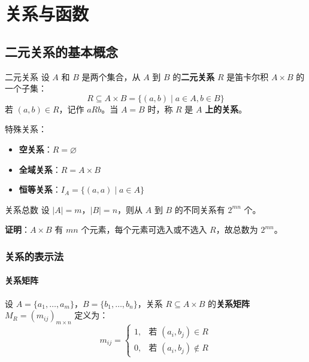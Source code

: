 \chapter{关系与函数}

\section{二元关系的基本概念}

\begin{mydefinition}{二元关系}
设 $A$ 和 $B$ 是两个集合，从 $A$ 到 $B$ 的\textbf{二元关系} $R$ 是笛卡尔积 $A \times B$ 的一个子集：
\[R \subseteq A \times B = \{(a,b) \mid a \in A, b \in B\}\]
若 $(a,b) \in R$，记作 $aRb$。当 $A = B$ 时，称 $R$ 是 $A$ \textbf{上的关系}。
\end{mydefinition}

特殊关系：
\begin{itemize}
\item \textbf{空关系}：$R = \varnothing$
\item \textbf{全域关系}：$R = A \times B$
\item \textbf{恒等关系}：$I_A = \{(a,a) \mid a \in A\}$
\end{itemize}

\begin{myTheorem}{关系总数}
设 $|A| = m$，$|B| = n$，则从 $A$ 到 $B$ 的不同关系有 $2^{mn}$ 个。

\textbf{证明}：$A \times B$ 有 $mn$ 个元素，每个元素可选入或不选入 $R$，故总数为 $2^{mn}$。
\end{myTheorem}

\subsection{关系的表示法}

\subsubsection{关系矩阵}

设 $A = \{a_1,\dots,a_m\}$，$B = \{b_1,\dots,b_n\}$，关系 $R \subseteq A \times B$ 的\textbf{关系矩阵} $M_R = (m_{ij})_{m \times n}$ 定义为：
\[m_{ij} = \begin{cases} 1, & \text{若 } (a_i,b_j) \in R \\ 0, & \text{若 } (a_i,b_j) \notin R \end{cases}\]

